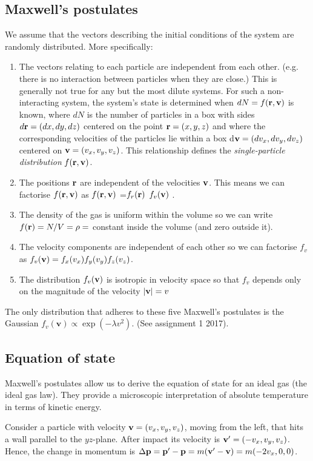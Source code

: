 \documentclass{article}
\begin{document}
\subsection{Maxwell's postulates}
We assume that the vectors describing the initial conditions of the system are randomly distributed. More specifically:
\begin{enumerate}
\item The vectors relating to each particle are independent from each other. (e.g. there is no interaction between particles when they are close.) This is generally not true for any but the most dilute systems. For such a non-interacting system, the system's state is determined when $dN=f({\bf r},{\bf v})$ is known, where $dN$ is the number of particles in a box with sides $d{\bf r}=(dx,dy,dz)$ centered on the point ${\bf r} = (x,y,z)$ and where the corresponding velocities of the particles lie within a box d${\bf v}=(dv_x,dv_y,dv_z)$ centered on ${\bf v}=(v_x,v_y,v_z)$. This relationship defines the \emph{single-particle distribution} $f({\bf r},{\bf v})$.
\item The positions ${\bf r}$ are independent of the velocities ${\bf v}$. This means we can factorise $f({\bf r},{\bf v})$ as $f({\bf r},{\bf v})$ =$f_r({\bf r})$ $f_v({\bf v})$ .
\item The density of the gas is uniform within the volume so we can write $f({\bf r}) = N/V=\rho=$ constant inside the volume (and zero outside it).
\item The velocity components are independent of each other so we can factorise $f_v$ as $f_v({\bf v})=f_x(v_x)f_y(v_y)f_z(v_z)$.
\item The distribution $f_v({\bf v})$ is isotropic in velocity space so that $f_v$ depends only on the magnitude of the velocity $|{\bf v}| = v$
\end{enumerate}

The only distribution that adheres to these five Maxwell's postulates is the Gaussian $f_v(\textbf{v}) \propto \exp(-\lambda v^2)$. (See assignment 1 2017).

\subsection{Equation of state}
Maxwell's postulates allow us to derive the equation of state for an ideal gas (the ideal gas law). They provide a microscopic interpretation of absolute temperature in terms of kinetic energy.

Consider a particle with velocity ${\bf v} = (v_x,v_y,v_z)$, moving from the left, that hits a wall parallel to the $yz$-plane. After impact its velocity is ${\bf v'}=(-v_x,v_y,v_z)$. Hence, the change in momentum is $\Delta {\bf p}= {\bf p'} - {\bf p} = m({\bf v'}-{\bf v}) = m(-2v_x,0,0)$.
\end{document}
